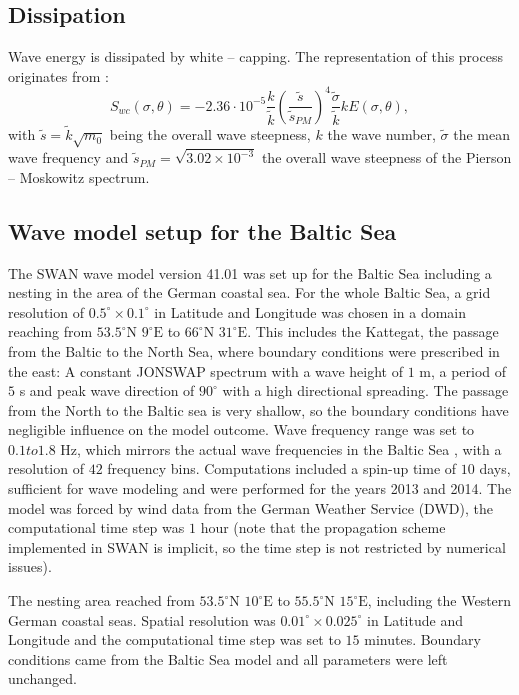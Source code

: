 \subsection{Dissipation}

Wave energy is dissipated by white -- capping. The representation of this process originates from \citep[][]{hasselmann1974}:
\begin{equation}
 S_{wc} (\sigma, \theta ) = - 2.36 \cdot 10^{-5} \frac{k}{\tilde{k}} \left( \frac{\tilde{s}}{\tilde{s}_{PM}} \right)^4 \frac{\tilde{\sigma}}{\tilde{k}} k E(\sigma, \theta),
\end{equation}
with $\tilde{s} = \tilde{k} \sqrt{m_0}$ being the overall wave steepness, $k$ the wave number, $\tilde{\sigma}$ the mean wave frequency and $\tilde{s}_{PM} = \sqrt{3.02 \times 10^{-3}}$ the overall wave steepness of the Pierson -- Moskowitz spectrum.


\subsection{Wave model setup for the Baltic Sea}\label{balticswan}

The SWAN wave model version 41.01 was set up for the Baltic Sea including a nesting in the area of the German coastal sea. For the whole Baltic Sea, a grid resolution of $0.5^\circ \times 0.1^\circ $ in Latitude and Longitude was chosen in a domain reaching from $53.5^\circ \text{N } 9^\circ \text{E}$ to $66^\circ \text{N } 31^\circ \text{E}$. This includes the Kattegat, the passage from the Baltic to the North Sea, where boundary conditions were prescribed in the east: A constant JONSWAP spectrum with a wave height of $1$ m, a period of $5$ s and peak wave direction of $90^\circ$ with a high directional spreading. The passage from the North to the Baltic sea is very shallow, so the boundary conditions have negligible influence on the model outcome. Wave frequency range was set to $0.1 to 1.8 \text{ Hz}$, which mirrors the actual wave frequencies in the Baltic Sea \citep[][]{balticsea}, with a resolution of $42$ frequency bins. Computations included a spin-up time of $10$ days, sufficient for wave modeling and were performed for the years 2013 and 2014. The model was forced by wind data from the German Weather Service (DWD), the computational time step was $1$ hour (note that the propagation scheme implemented in SWAN is implicit, so the time step is not restricted by numerical issues). 

The nesting area reached from $53.5^\circ \text{N } 10^\circ \text{E}$ to $55.5^\circ \text{N } 15^\circ \text{E}$, including the Western German coastal seas. Spatial resolution was $0.01^\circ \times 0.025^\circ $ in Latitude and Longitude and the computational time step was set to $15$ minutes. Boundary conditions came from the Baltic Sea model and all parameters were left unchanged.

